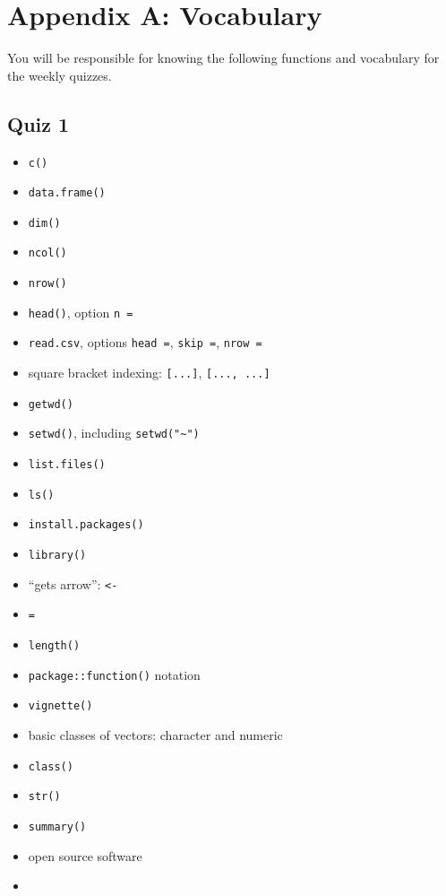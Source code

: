 \documentclass[]{book}
\providecommand{\tightlist}{%
  \setlength{\itemsep}{0pt}\setlength{\parskip}{0pt}}
\theoremstyle{definition}
\theoremstyle{definition}
\theoremstyle{definition}
\theoremstyle{remark}
\begin{document}
\appendix


\chapter{Appendix A: Vocabulary}\label{appendix-a-vocabulary}

You will be responsible for knowing the following functions and
vocabulary for the weekly quizzes.

\section{Quiz 1}\label{quiz-1}

\begin{itemize}
\tightlist
\item
  \texttt{c()}
\item
  \texttt{data.frame()}
\item
  \texttt{dim()}
\item
  \texttt{ncol()}
\item
  \texttt{nrow()}
\item
  \texttt{head()}, option \texttt{n\ =}
\item
  \texttt{read.csv}, options \texttt{head\ =}, \texttt{skip\ =},
  \texttt{nrow\ =}
\item
  square bracket indexing: \texttt{{[}...{]}}, \texttt{{[}...,\ ...{]}}
\item
  \texttt{getwd()}
\item
  \texttt{setwd()}, including \texttt{setwd("\textasciitilde{}")}
\item
  \texttt{list.files()}
\item
  \texttt{ls()}
\item
  \texttt{install.packages()}
\item
  \texttt{library()}
\item
  ``gets arrow'': \texttt{\textless{}-}
\item
  \texttt{=}
\item
  \texttt{length()}
\item
  \texttt{package::function()} notation
\item
  \texttt{vignette()}
\item
  basic classes of vectors: character and numeric
\item
  \texttt{class()}
\item
  \texttt{str()}
\item
  \texttt{summary()}
\item
  open source software
\item

\end{itemize}
\end{document}
